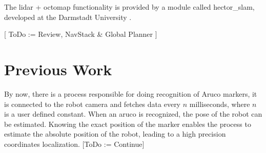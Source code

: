     The lidar + octomap functionality is provided by a module called hector\_slam, developed at the Darmstadt University \cite{hector_slam}. 

    [ ToDo := Review, NavStack \& Global Planner ]

  \section{Previous Work} \label{ch_2:sect:3}

    By now, there is a process responsible for doing recognition of Aruco markers, it is connected to the robot camera and fetches data every $n$ milliseconds, where $n$ is a user defined constant. When an aruco is recognized, the pose of the robot can be estimated. Knowing the exact position of the marker enables the process to estimate the absolute position of the robot, leading to a high precision coordinates localization. [ToDo := Continue]

    \begin{comment}
      \begin{itemize}
      \end{itemize}
    \end{comment}

